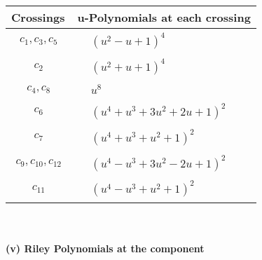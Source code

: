 \documentclass[1p]{elsarticle_modified}
\theoremstyle{definition}
\begin{document}
\begin{tabular}{m{50pt}|m{274pt}}
Crossings & \hspace{64pt}u-Polynomials at each crossing \\
\hline $$\begin{aligned}c_{1},c_{3},c_{5}\end{aligned}$$&$\begin{aligned}
&(u^2- u+1)^4
\end{aligned}$\\
\hline $$\begin{aligned}c_{2}\end{aligned}$$&$\begin{aligned}
&(u^2+u+1)^4
\end{aligned}$\\
\hline $$\begin{aligned}c_{4},c_{8}\end{aligned}$$&$\begin{aligned}
&u^8
\end{aligned}$\\
\hline $$\begin{aligned}c_{6}\end{aligned}$$&$\begin{aligned}
&(u^4+u^3+3 u^2+2 u+1)^2
\end{aligned}$\\
\hline $$\begin{aligned}c_{7}\end{aligned}$$&$\begin{aligned}
&(u^4+u^3+u^2+1)^2
\end{aligned}$\\
\hline $$\begin{aligned}c_{9},c_{10},c_{12}\end{aligned}$$&$\begin{aligned}
&(u^4- u^3+3 u^2-2 u+1)^2
\end{aligned}$\\
\hline $$\begin{aligned}c_{11}\end{aligned}$$&$\begin{aligned}
&(u^4- u^3+u^2+1)^2
\end{aligned}$\\
\hline
\end{tabular}\\~\\
\newpage\renewcommand{\arraystretch}{1}
\flushleft \textbf{(v) Riley Polynomials at the component}\newline \\
\end{document}
